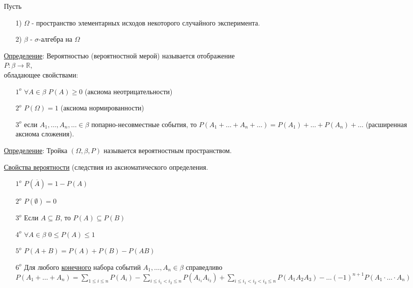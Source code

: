 
Пусть
\begin{enumerate}
	\item[1)]
	$\Omega$ - пространство элементарных исходов некоторого случайного эксперимента.
	
	\item[2)]
	$\beta$ - $\sigma$-алгебра на $\Omega$
\end{enumerate}

\underline{Определение}: Вероятностью (вероятностной мерой) называется отображение \\
$P : \beta \rightarrow \mathbb{R}$, \\
обладающее свойствами: 
\begin{enumerate}
	\item[$1^o$]
	$\forall A \in \beta$ $P(A) \geqslant 0$ (аксиома неотрицательности)
	
	\item[$2^o$]
	$P(\Omega) = 1$ (аксиома нормированности)
	
	\item[$3^o$]
	если $A_1, \ldots , A_n, \ldots \in \beta$ попарно-несовместные события, то $P(A_1 + \ldots + A_n + \ldots) = P(A_1) + \ldots + P(A_n) + \ldots$ (расширенная аксиома сложения).
\end{enumerate}

\underline{Определение}: Тройка $(\Omega, \beta, P)$ называется вероятностным пространством.

\underline{Свойства вероятности} (следствия из аксиоматического определения.
\begin{enumerate}
	\item[$1^o$]
	$P(\overline{A}) = 1 - P(A)$
	
	\item[$2^o$]
	$P(\emptyset) = 0$
	
	\item[$3^o$]
	Если $A \subseteq B$, то $P(A) \subseteq P(B)$
	
	\item[$4^o$]
	$\forall A \in \beta$ $0 \leqslant P(A) \leqslant 1$
	
	\item[$5^o$]
	$P(A+B) = P(A) + P(B) - P(AB)$
	
	\item[$6^o$]
	Для любого \underline{конечного} набора событий $A_1, \ldots , A_n \in \beta$ справедливо $P(A_1 + \ldots + A_n) = \sum\limits_{1 \leqslant i \leqslant n} P(A_i) - 
	\sum\limits_{i \leqslant i_1 < i_2 \leqslant n} P(A_{i_1} A_{i_2}) + 
	\sum\limits_{i \leqslant i_1 < i_2 < i_3 \leqslant n} P(A_1 A_2 A_3) - 
	\ldots (-1)^{n+1} P(A_1 \cdot \ldots \cdot A_n)$
\end{enumerate}

